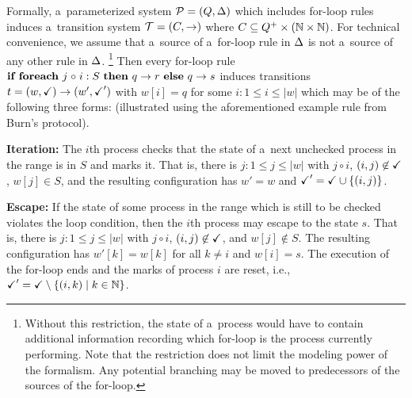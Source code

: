 Formally, a~parameterized system ${\mathcal P}=(Q,\Delta)$ which
includes for-loop rules induces a~transition system ${\mathcal T} =
(C,\rightarrow)$ where $C \subseteq Q^+\times (\mathbb N\times\mathbb N)$.  For
technical convenience, we assume that a~source of a~for-loop rule in
$\Delta$ is not a~source of any other rule in $\Delta$.%
%
\footnote{Without this restriction, the state of a~process would have
  to contain additional information recording which for-loop is the
  process currently performing.  Note that the restriction does not
  limit the modeling power of the formalism.  Any potential branching
  may be moved to predecessors of the sources of the for-loop.}%
%
Then every for-loop rule $ \forrule q r \circ S s $ induces
transitions $t = (w,\checkmark) \rightarrow (w',\checkmark')$ with $w[i] = q$ for
some $i:1\leq i \leq |w|$ which may be of the following three forms:
(illustrated using the aforementioned example rule from Burn's
protocol).

\noindent\begin{minipage}[!t]{0.7\linewidth}%
  {\bf Iteration:} The $i$th process checks that the state of a~next
  unchecked process in the range is in $S$ and marks it.  That is,
  there is $j:1\leq j \leq |w|$ with $j\circ i$, $(i,j)\not\in\checkmark$,
  $w[j]\in S$, and the resulting configuration has $w'=w$ and
  $\checkmark'=\checkmark\cup\{(i,j)\}$.
\end{minipage}
\hfill%
\begin{minipage}[!t]{0.29\linewidth}%
  
\end{minipage}

\noindent\begin{minipage}[!t]{0.7\linewidth}%
  {\bf Escape:} If the state of some process in the range which is
  still to be checked violates the loop condition, then the $i$th
  process may escape to the state $s$.  That is, there is $j:1\leq j
  \leq |w|$ with $j\circ i$, $(i,j)\not\in\checkmark$, and $w[j]\not\in S$.
  The resulting configuration has $w'[k]=w[k]$ for all $k\neq i$ and
  $w[i] = s$. The execution of the for-loop ends and the marks of
  process $i$ are reset, i.e., $\checkmark' = \checkmark\setminus\{(i,k)\mid
  k\in \mathbb N\}$.
\end{minipage}
\hfill%
\begin{minipage}[!t]{0.29\linewidth}%
  
\end{minipage}

